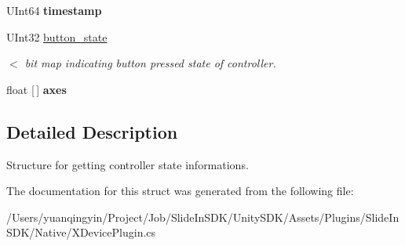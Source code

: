 \begin{DoxyCompactItemize}
U\+Int64 {\bfseries timestamp}
\item 
\mbox{\label{struct_ximmerse_1_1_input_system_1_1_x_device_plugin_1_1_x_attr_controller_state_a80646b620537b58fac7094628da3e088}} 
U\+Int32 \mbox{\hyperlink{struct_ximmerse_1_1_input_system_1_1_x_device_plugin_1_1_x_attr_controller_state_a80646b620537b58fac7094628da3e088}{button\+\_\+state}}
\begin{DoxyCompactList}\small\item\em $<$ bit map indicating button pressed state of controller. \end{DoxyCompactList}\item 
\mbox{\label{struct_ximmerse_1_1_input_system_1_1_x_device_plugin_1_1_x_attr_controller_state_ad1b2669845f9079cb9fee9651c8b516c}} 
float \mbox{[}$\,$\mbox{]} {\bfseries axes}
\end{DoxyCompactItemize}


\subsection{Detailed Description}
Structure for getting controller state informations. 

The documentation for this struct was generated from the following file\+:\begin{DoxyCompactItemize}
\item 
/\+Users/yuanqingyin/\+Project/\+Job/\+Slide\+In\+S\+D\+K/\+Unity\+S\+D\+K/\+Assets/\+Plugins/\+Slide\+In\+S\+D\+K/\+Native/X\+Device\+Plugin.\+cs\end{DoxyCompactItemize}
